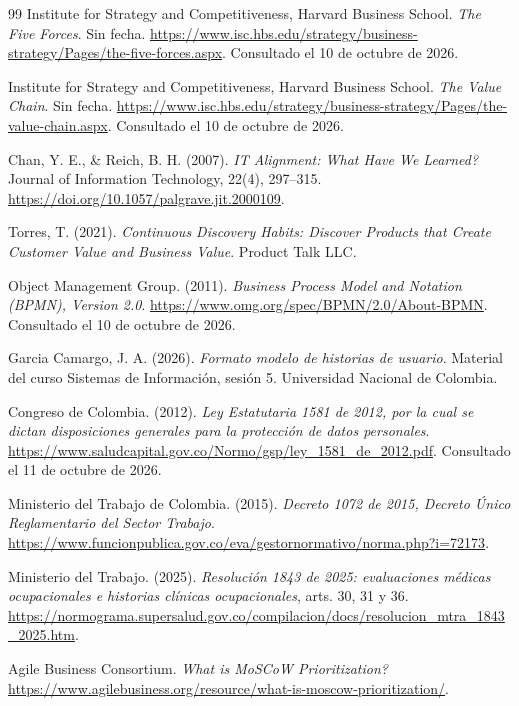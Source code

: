 \documentclass[12pt,letterpaper]{article}
\begin{document}
\FloatBarrier
{}
\renewcommand{\refname}{Referencias}
\begin{thebibliography}{99}
Institute for Strategy and Competitiveness, Harvard Business School.
\emph{The Five Forces}. Sin fecha.
\url{https://www.isc.hbs.edu/strategy/business-strategy/Pages/the-five-forces.aspx}.
Consultado el 10 de octubre de 2026.

Institute for Strategy and Competitiveness, Harvard Business School.
\emph{The Value Chain}. Sin fecha.
\url{https://www.isc.hbs.edu/strategy/business-strategy/Pages/the-value-chain.aspx}.
Consultado el 10 de octubre de 2026.

Chan, Y. E., \& Reich, B. H. (2007).
\emph{IT Alignment: What Have We Learned?}
Journal of Information Technology, 22(4), 297--315.
\url{https://doi.org/10.1057/palgrave.jit.2000109}.

Torres, T. (2021).
\emph{Continuous Discovery Habits: Discover Products that Create Customer Value and Business Value}.
Product Talk LLC.

Object Management Group. (2011).
\emph{Business Process Model and Notation (BPMN), Version 2.0}.
\url{https://www.omg.org/spec/BPMN/2.0/About-BPMN}.
Consultado el 10 de octubre de 2026.

Garcia Camargo, J. A. (2026).
\emph{Formato modelo de historias de usuario}.
Material del curso Sistemas de Información, sesión 5. Universidad Nacional de Colombia.

Congreso de Colombia. (2012).
\emph{Ley Estatutaria 1581 de 2012, por la cual se dictan disposiciones generales para la protección de datos personales}.
\url{https://www.saludcapital.gov.co/Normo/gsp/ley_1581_de_2012.pdf}.
Consultado el 11 de octubre de 2026.

Ministerio del Trabajo de Colombia. (2015).
\emph{Decreto 1072 de 2015, Decreto Único Reglamentario del Sector Trabajo}.
\url{https://www.funcionpublica.gov.co/eva/gestornormativo/norma.php?i=72173}.

Ministerio del Trabajo. (2025). \emph{Resolución 1843 de 2025: evaluaciones médicas ocupacionales e historias clínicas ocupacionales}, arts. 30, 31 y 36.
\url{https://normograma.supersalud.gov.co/compilacion/docs/resolucion_mtra_1843_2025.htm}.

Agile Business Consortium. \emph{What is MoSCoW Prioritization?}
\url{https://www.agilebusiness.org/resource/what-is-moscow-prioritization/}.


\end{thebibliography}
\end{document}
